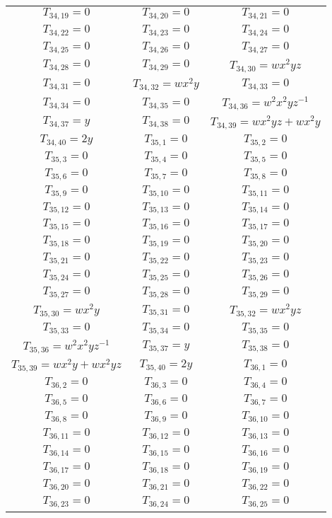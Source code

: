 \begin{longtable}{|c|c|c|}
$T_{34,19}= 0$&
$T_{34,20}= 0$&
$T_{34,21}= 0$\\
$T_{34,22}= 0$&
$T_{34,23}= 0$&
$T_{34,24}= 0$\\
$T_{34,25}= 0$&
$T_{34,26}= 0$&
$T_{34,27}= 0$\\
$T_{34,28}= 0$&
$T_{34,29}= 0$&
$T_{34,30}= wx^2yz$\\
$T_{34,31}= 0$&
$T_{34,32}= wx^2y$&
$T_{34,33}= 0$\\
$T_{34,34}= 0$&
$T_{34,35}= 0$&
$T_{34,36}= w^2x^2yz^{-1}$\\
$T_{34,37}= y$&
$T_{34,38}= 0$&
$T_{34,39}= wx^2yz+wx^2y$\\
$T_{34,40}= 2y$&
$T_{35,1}= 0$&
$T_{35,2}= 0$\\
$T_{35,3}= 0$&
$T_{35,4}= 0$&
$T_{35,5}= 0$\\
$T_{35,6}= 0$&
$T_{35,7}= 0$&
$T_{35,8}= 0$\\
$T_{35,9}= 0$&
$T_{35,10}= 0$&
$T_{35,11}= 0$\\
$T_{35,12}= 0$&
$T_{35,13}= 0$&
$T_{35,14}= 0$\\
$T_{35,15}= 0$&
$T_{35,16}= 0$&
$T_{35,17}= 0$\\
$T_{35,18}= 0$&
$T_{35,19}= 0$&
$T_{35,20}= 0$\\
$T_{35,21}= 0$&
$T_{35,22}= 0$&
$T_{35,23}= 0$\\
$T_{35,24}= 0$&
$T_{35,25}= 0$&
$T_{35,26}= 0$\\
$T_{35,27}= 0$&
$T_{35,28}= 0$&
$T_{35,29}= 0$\\
$T_{35,30}= wx^2y$&
$T_{35,31}= 0$&
$T_{35,32}= wx^2yz$\\
$T_{35,33}= 0$&
$T_{35,34}= 0$&
$T_{35,35}= 0$\\
$T_{35,36}= w^2x^2yz^{-1}$&
$T_{35,37}= y$&
$T_{35,38}= 0$\\
$T_{35,39}= wx^2y+wx^2yz$&
$T_{35,40}= 2y$&
$T_{36,1}= 0$\\
$T_{36,2}= 0$&
$T_{36,3}= 0$&
$T_{36,4}= 0$\\
$T_{36,5}= 0$&
$T_{36,6}= 0$&
$T_{36,7}= 0$\\
$T_{36,8}= 0$&
$T_{36,9}= 0$&
$T_{36,10}= 0$\\
$T_{36,11}= 0$&
$T_{36,12}= 0$&
$T_{36,13}= 0$\\
$T_{36,14}= 0$&
$T_{36,15}= 0$&
$T_{36,16}= 0$\\
$T_{36,17}= 0$&
$T_{36,18}= 0$&
$T_{36,19}= 0$\\
$T_{36,20}= 0$&
$T_{36,21}= 0$&
$T_{36,22}= 0$\\
$T_{36,23}= 0$&
$T_{36,24}= 0$&
$T_{36,25}= 0$\\

\end{longtable}
